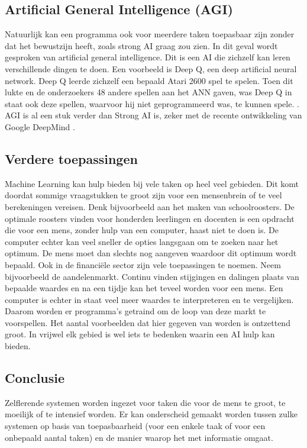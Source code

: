 \subsection{Artificial General Intelligence (AGI)}
Natuurlijk kan een programma ook voor meerdere taken toepasbaar zijn zonder dat het bewustzijn heeft, zoals strong AI graag zou zien. In dit geval wordt gesproken van artificial general intelligence. Dit is een AI die zichzelf kan leren verschillende dingen te doen. Een voorbeeld is Deep Q, een deep artificial neural network. Deep Q leerde zichzelf een bepaald Atari 2600 spel te spelen. Toen dit lukte en de onderzoekers 48 andere spellen aan het ANN gaven, was Deep Q in staat ook deze spellen, waarvoor hij niet geprogrammeerd was, te kunnen spele. \cite{DeepQ}.
AGI is al een stuk verder dan Strong AI is, zeker met de recente ontwikkeling van Google DeepMind \cite{DeepMind1}.

\subsection{Verdere toepassingen}
Machine Learning kan hulp bieden bij vele taken op heel veel gebieden. Dit komt doordat sommige vraagstukken te groot zijn voor een mensenbrein of te veel berekeningen vereisen. Denk bijvoorbeeld aan het maken van schoolroosters. De optimale roosters vinden voor honderden leerlingen en docenten is een opdracht die voor een mens, zonder hulp van een computer, haast niet te doen is. De computer echter kan veel sneller de opties langsgaan om te zoeken naar het optimum. De mens moet dan slechts nog aangeven waardoor dit optimum wordt bepaald.
Ook in de financi\"{e}le sector zijn vele toepassingen te noemen. Neem bijvoorbeeld de aandelenmarkt. Continu vinden stijgingen en dalingen plaats van bepaalde waardes en na een tijdje kan het teveel worden voor een mens. Een computer is echter in staat veel meer waardes te interpreteren en te vergelijken. Daarom worden er programma's getraind om de loop van deze markt te voorspellen.
Het aantal voorbeelden dat hier gegeven van worden is ontzettend groot. In vrijwel elk gebied is wel iets te bedenken waarin een AI hulp kan bieden.

\subsection{Conclusie}
Zelflerende systemen worden ingezet voor taken die voor de mens te groot, te moeilijk of te intensief worden. Er kan onderscheid gemaakt worden tussen zulke systemen op basis van toepasbaarheid (voor een enkele taak of voor een onbepaald aantal taken) en de manier waarop het met informatie omgaat.